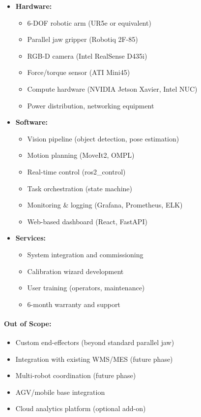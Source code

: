 \documentclass[
]{article}
\providecommand{\tightlist}{%
  \setlength{\itemsep}{0pt}\setlength{\parskip}{0pt}}
\begin{document}
\begin{itemize}
\tightlist
\item
  \textbf{Hardware:}

  \begin{itemize}
  \tightlist
  \item
    6-DOF robotic arm (UR5e or equivalent)
  \item
    Parallel jaw gripper (Robotiq 2F-85)
  \item
    RGB-D camera (Intel RealSense D435i)
  \item
    Force/torque sensor (ATI Mini45)
  \item
    Compute hardware (NVIDIA Jetson Xavier, Intel NUC)
  \item
    Power distribution, networking equipment
  \end{itemize}
\item
  \textbf{Software:}

  \begin{itemize}
  \tightlist
  \item
    Vision pipeline (object detection, pose estimation)
  \item
    Motion planning (MoveIt2, OMPL)
  \item
    Real-time control (ros2\_control)
  \item
    Task orchestration (state machine)
  \item
    Monitoring \& logging (Grafana, Prometheus, ELK)
  \item
    Web-based dashboard (React, FastAPI)
  \end{itemize}
\item
  \textbf{Services:}

  \begin{itemize}
  \tightlist
  \item
    System integration and commissioning
  \item
    Calibration wizard development
  \item
    User training (operators, maintenance)
  \item
    6-month warranty and support
  \end{itemize}
\end{itemize}

\hypertarget{out-of-scope}{%
\paragraph{Out of Scope:}\label{out-of-scope}}

\begin{itemize}
\tightlist
\item
  Custom end-effectors (beyond standard parallel jaw)
\item
  Integration with existing WMS/MES (future phase)
\item
  Multi-robot coordination (future phase)
\item
  AGV/mobile base integration
\item
  Cloud analytics platform (optional add-on)
\end{itemize}
\end{document}
